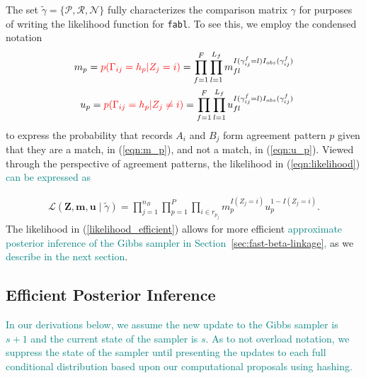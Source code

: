 \documentclass[ba]{imsart}
\begin{document}
The set $\tilde{\gamma} = \{\mathcal{P}, \mathcal{R}, \mathcal{N}\}$ fully characterizes the comparison matrix $\gamma$ for purposes of writing the likelihood function for \texttt{fabl}. To see this, we employ the condensed notation
\begin{subequations}
	\begin{align}
		m_p =  \textcolor{red}{p(\Gamma_{ij} = h_p|Z_j = i)} = \prod_{f=1}^{F}\prod_{l=1}^{L_f} m_{fl}^{I(\gamma_{ij}^f = l)I_{obs}(\gamma_{ij}^f)}\label{eqn:m_p} \\
		u_p =  \textcolor{red}{p(\Gamma_{ij} = h_p|Z_j \neq i)} = \prod_{f=1}^{F}\prod_{l=1}^{L_f} u_{fl}^{I(\gamma_{ij}^f = l)I_{obs}(\gamma_{ij}^f)}\label{eqn:u_p}
	\end{align}
\end{subequations}
to express the probability that records $A_i$ and $B_j$ form agreement pattern $p$ given that they are a match, in (\ref{eqn:m_p}), and not a match, in (\ref{eqn:u_p}). Viewed through the perspective of agreement patterns, the likelihood in (\ref{eqn:likelihood}) \textcolor{teal}{can be expressed as}

\begin{align}\label{likelihood_efficient}
	\mathcal{L}(\bm{Z}, \bm{m}, \bm{u} \mid \tilde{\gamma}) = \prod_{j=1}^{n_B}\prod_{p=1}^P \prod_{i \in r_{p_j}} m_p^{I(Z_j = i)}u_p^{1 - I(Z_j = i)}. 
\end{align}
The likelihood in (\ref{likelihood_efficient}) allows for more
efficient \textcolor{teal}{approximate posterior inference of the Gibbs sampler in Section~\ref{sec:fast-beta-linkage},}  as we \textcolor{teal}{describe in the next section}.


\hypertarget{efficient-posterior}{%
	\subsection{Efficient Posterior Inference }\label{efficient-posterior}}

\textcolor{teal}{In our derivations below, we assume the new update to the Gibbs sampler is $s+1$ and the current state of the sampler is $s.$ As to not overload notation, we suppress the state of the sampler until presenting the updates to each full conditional distribution based upon our computational proposals using hashing.} 
\end{document}
